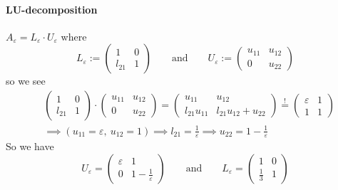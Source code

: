 \paragraph{LU-decomposition} \(A_\varepsilon = L_\varepsilon \cdot U_\varepsilon\) where
\[L_\varepsilon := \begin{pmatrix}1 & 0\\l_{21} & 1\end{pmatrix} \qquad\text{and}\qquad U_\varepsilon := \begin{pmatrix}u_{11} & u_{12}\\0 & u_{22}\end{pmatrix}\]
so we see
\begin{equation*}
   \begin{split}
      & \begin{pmatrix}1 & 0\\l_{21} & 1\end{pmatrix} \cdot \begin{pmatrix}u_{11} & u_{12}\\0 & u_{22}\end{pmatrix} = \begin{pmatrix}u_{11} & u_{12}\\l_{21}u_{11} & l_{21}u_{12} + u_{22}\end{pmatrix} \overset{!}{=} \begin{pmatrix}\varepsilon & 1\\1 & 1\end{pmatrix}\\
      & \implies (u_{11} = \varepsilon,~u_{12}=1) \implies l_{21} = \frac{1}{\varepsilon} \implies u_{22} = 1 - \frac{1}{\varepsilon}
   \end{split}
\end{equation*}
So we have
\[U_\varepsilon = \begin{pmatrix}\varepsilon & 1\\0 & 1-\frac{1}{\varepsilon}\end{pmatrix} \qquad\text{and}\qquad L_\varepsilon = \begin{pmatrix}1 & 0\\ \frac{1}{3} & 1\end{pmatrix}\]

